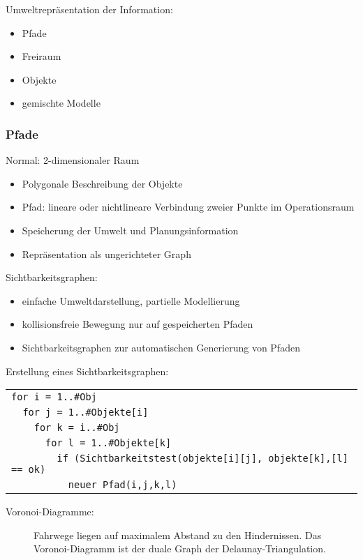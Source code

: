 Umweltrepräsentation der Information:
\begin{itemize}
\item Pfade \item Freiraum \item Objekte \item gemischte Modelle
\end{itemize}

\subsubsection*{Pfade}

Normal: 2-dimensionaler Raum
\begin{itemize}
\item Polygonale Beschreibung der Objekte
\item Pfad: lineare oder nichtlineare Verbindung zweier Punkte im Operationsraum
\item Speicherung der Umwelt und Planungsinformation
\item Repräsentation als ungerichteter Graph
\end{itemize}
Sichtbarkeitsgraphen:
\begin{itemize}
\item einfache Umweltdarstellung, partielle Modellierung
\item kollisionsfreie Bewegung nur auf gespeicherten Pfaden
\item Sichtbarkeitsgraphen zur automatischen Generierung von Pfaden
\end{itemize}
Erstellung eines Sichtbarkeitsgraphen:
\begin{center}
\begin{tabular}{l}
\verb|for i = 1..#Obj| \\
\verb|  for j = 1..#Objekte[i]| \\
\verb|    for k = i..#Obj| \\
\verb|      for l = 1..#Objekte[k]| \\
\verb|        if (Sichtbarkeitstest(objekte[i][j], objekte[k],[l] == ok)| \\
\verb|          neuer Pfad(i,j,k,l)|
\end{tabular}
\end{center}
\begin{description}
\item[Voronoi-Diagramme:] Fahrwege liegen auf maximalem Abstand zu den Hindernissen. Das Voronoi-Diagramm ist der duale Graph der Delaunay-Triangulation.
\end{description}

